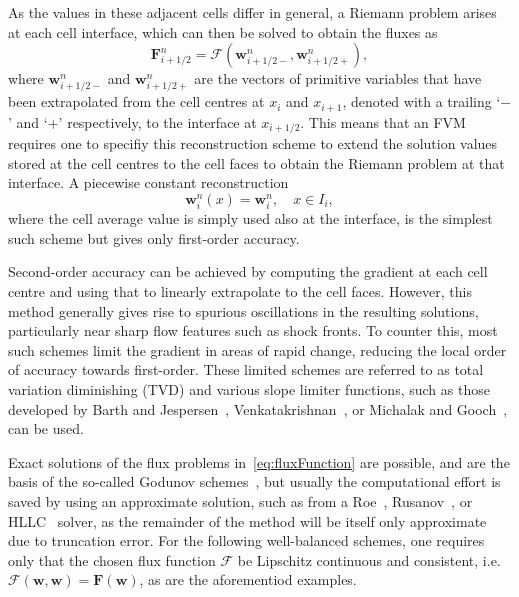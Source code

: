 As the values in these adjacent cells differ in general, a Riemann problem arises at each cell interface, which can then be solved to obtain the fluxes as
\begin{equation} \label{eq:fluxFunction}
\mathbf{F}_{i+1/2}^n=\bm{\mathcal{F}}\left(\mathbf{w}_{i+1/2-}^n,\mathbf{w}_{i+1/2+}^n\right),
\end{equation}
where $\mathbf{w}_{i+1/2-}^n$ and $\mathbf{w}_{i+1/2+}^n$ are the vectors of primitive variables that have been extrapolated from the cell centres at $x_i$ and $x_{i+1}$, denoted with a trailing `$-$' and `$+$' respectively, to the interface at $x_{i+1/2}$. This means that an FVM requires one to specifiy this reconstruction scheme to extend the solution values stored at the cell centres to the cell faces to obtain the Riemann problem at that interface. A piecewise constant reconstruction
\begin{equation}
\mathbf{w}_i^n(x)=\mathbf{w}_i^n,\quad x\in I_i,
\end{equation}
where the cell average value is simply used also at the interface, is the simplest such scheme but gives only first-order accuracy.

Second-order accuracy can be achieved by computing the gradient at each cell centre and using that to linearly extrapolate to the cell faces. However, this method generally gives rise to spurious oscillations in the resulting solutions, particularly near sharp flow features such as shock fronts. To counter this, most such schemes limit the gradient in areas of rapid change, reducing the local order of accuracy towards first-order. These limited schemes are referred to as total variation diminishing (TVD) and various slope limiter functions, such as those developed by Barth and Jespersen~\cite{Barth1989}, Venkatakrishnan~\cite{Venkatakrishnan1993,Venkatakrishnan1995}, or Michalak and Gooch~\cite{Michalak2008}, can be used.

Exact solutions of the flux problems in~\eqref{eq:fluxFunction} are possible, and are the basis of the so-called Godunov schemes~\cite{Godunov1959}, but usually the computational effort is saved by using an approximate solution, such as from a Roe~\cite{Roe1981}, Rusanov~\cite{Rusanov1961}, or HLLC~\cite{Toro1994} solver, as the remainder of the method will be itself only approximate due to truncation error. For the following well-balanced schemes, one requires only that the chosen flux function $\bm{\mathcal{F}}$ be Lipschitz continuous and consistent, i.e.~$\bm{\mathcal{F}}(\mathbf{w},\mathbf{w})=\mathbf{F}(\mathbf{w})$, as are the aforementiod examples.

